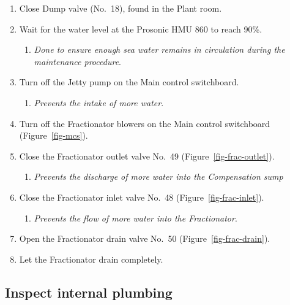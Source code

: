 \documentclass[
  letterpaper,
  DIV=11,
  numbers=noendperiod]{scrreprt}
\providecommand{\tightlist}{%
  \setlength{\itemsep}{0pt}\setlength{\parskip}{0pt}}\usepackage{longtable,booktabs,array}
\begin{document}
\begin{enumerate}
\def\labelenumi{\arabic{enumi}.}
\tightlist
\item
  Close Dump valve (No.~18), found in the Plant room.
\item
  Wait for the water level at the Prosonic HMU 860 to reach 90\%.

  \begin{enumerate}
  \def\labelenumii{\roman{enumii})}
  \tightlist
  \item
    \emph{Done to ensure enough sea water remains in circulation during
    the maintenance procedure}.
  \end{enumerate}
\item
  Turn off the Jetty pump on the Main control switchboard.

  \begin{enumerate}
  \def\labelenumii{\roman{enumii})}
  \tightlist
  \item
    \emph{Prevents the intake of more water}.
  \end{enumerate}
\item
  Turn off the Fractionator blowers on the Main control switchboard
  (Figure~\ref{fig-mcs}).
\item
  Close the Fractionator outlet valve No.~49
  (Figure~\ref{fig-frac-outlet}).

  \begin{enumerate}
  \def\labelenumii{\roman{enumii})}
  \tightlist
  \item
    \emph{Prevents the discharge of more water into the Compensation
    sump}
  \end{enumerate}
\item
  Close the Fractionator inlet valve No.~48
  (Figure~\ref{fig-frac-inlet}).

  \begin{enumerate}
  \def\labelenumii{\roman{enumii})}
  \tightlist
  \item
    \emph{Prevents the flow of more water into the Fractionator}.
  \end{enumerate}
\item
  Open the Fractionator drain valve No.~50
  (Figure~\ref{fig-frac-drain}).
\item
  Let the Fractionator drain completely.
\end{enumerate}

\hypertarget{inspect-internal-plumbing}{%
\subsection{Inspect internal plumbing}\label{inspect-internal-plumbing}}
\end{document}
